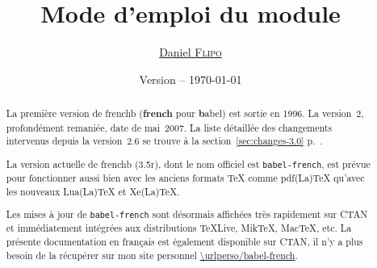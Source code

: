 \documentclass[a4paper,12pt,german,english,french]{article}
\title{Mode d’emploi du module \ext{babel-french}}
\author{\href{mailto:daniel.flipo@free.fr}{Daniel \textsc{Flipo}}}
\date{Version {\latestversion} -- \today}
\def\ColorVerb{\color{MidnightBlue}}
\newcommand*{\ext}[1]{\texttt{\ColorVerb #1}}
\newcommand*{\latestversion}{3.5r}
\begin{document}
\maketitle
\thispagestyle{empty}

\begin{abstract}
  La première version de frenchb (\textbf{french} pour \textbf{b}abel) est
  sortie en 1996.  La version~2, profondément remaniée, date de mai~2007.
  La liste détaillée des changements intervenus depuis la version~2.6 se
  trouve à la section~\ref{sec:changes-3.0} p.~\pageref{sec:changes-3.0}.

  La version actuelle de frenchb (\latestversion), dont le nom officiel est
  \ext{babel-french}, est prévue pour fonctionner aussi bien avec les anciens
  formats TeX comme pdf(La)TeX qu’avec les nouveaux Lua(La)TeX et Xe(La)TeX.

  Les mises à jour de \ext{babel-french} sont désormais affichées très
  rapidement sur CTAN et immédiatement intégrées aux distributions TeXLive,
  MikTeX, MacTeX, etc.
  La présente documentation en français est également disponible sur CTAN,
  il n’y a plus besoin de la récupérer sur mon site
  personnel {\expandafter\expandafter\expandafter\url{\urlperso/babel-french}}.
\end{abstract}
\end{document}
